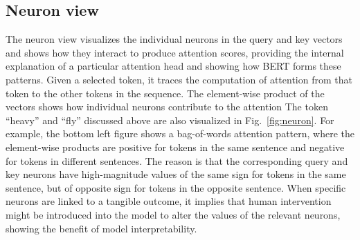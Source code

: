 \documentclass[]{article}
\begin{document}
\subsection{Neuron view}
\label{sec:neuron}
The neuron view visualizes the individual neurons in the query and key vectors and shows how they interact to produce attention scores, providing the internal explanation of a particular attention head and showing how BERT forms these patterns.
Given a selected token, it traces the computation of attention from that token to the other tokens in the sequence.
The element-wise product of the vectors shows how individual neurons contribute to the attention
The token ``heavy'' and ``fly'' discussed above are also visualized in Fig.~\ref{fig:neuron}. 
For example, the bottom left figure shows a bag-of-words attention pattern, where the element-wise products are positive for tokens in the same sentence and negative for tokens in different sentences. 
The reason is that the corresponding query
and key neurons have high-magnitude values of the same sign for tokens in the same sentence, but of
opposite sign for tokens in the opposite sentence. 
When specific neurons are linked to a tangible outcome, it implies that human intervention might be introduced into the model to alter the values of the relevant neurons, showing the benefit of model interpretability. 
\end{document}
